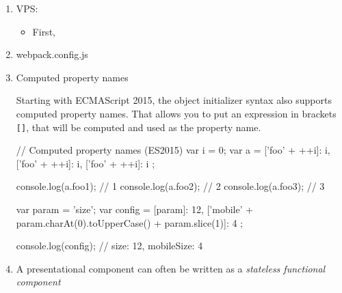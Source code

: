 \documentclass[a4paper,12pt]{article}
\begin{document}
\fontsize{14pt}{15.6pt}
\selectfont

\begin{enumerate}

\item VPS:
\begin{itemize}
  \item First,
\end{itemize}

\item webpack.config.js

\item Computed property names

Starting with ECMAScript 2015, the object initializer syntax also supports computed property names. That allows you to put an expression in brackets \verb|[]|, that will be computed and used as the property name.
\begin{jscode}
// Computed property names (ES2015)
var i = 0;
var a = {
  ['foo' + ++i]: i,
  ['foo' + ++i]: i,
  ['foo' + ++i]: i
};

console.log(a.foo1); // 1
console.log(a.foo2); // 2
console.log(a.foo3); // 3

var param = 'size';
var config = {
  [param]: 12,
  ['mobile' + param.charAt(0).toUpperCase() + param.slice(1)]: 4
};

console.log(config); // {size: 12, mobileSize: 4}
\end{jscode}

\item A presentational component can often be written as a \textit{stateless functional component}


\end{enumerate}
\end{document}
